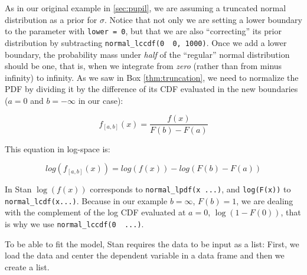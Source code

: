 \documentclass[12pt,]{krantz}
\newenvironment{Shaded}{\begin{snugshade}}{\end{snugshade}}
\newcommand{\KeywordTok}[1]{\textcolor[rgb]{0.13,0.29,0.53}{\textbf{#1}}}
\newcommand{\DataTypeTok}[1]{\textcolor[rgb]{0.13,0.29,0.53}{#1}}
\newcommand{\StringTok}[1]{\textcolor[rgb]{0.31,0.60,0.02}{#1}}
\newcommand{\OperatorTok}[1]{\textcolor[rgb]{0.81,0.36,0.00}{\textbf{#1}}}
\newcommand{\NormalTok}[1]{#1}
\theoremstyle{definition}
\theoremstyle{definition}
\theoremstyle{definition}
\theoremstyle{remark}
\begin{document}
As in our original example in \ref{sec:pupil}, we are assuming a
truncated normal distribution as a prior for \(\sigma\). Notice that not
only we are setting a lower boundary to the parameter with
\texttt{lower\ =\ 0}, but that we are also ``correcting'' its prior
distribution by subtracting
\texttt{normal\_lccdf(0\ \textbar{}\ 0,\ 1000)}. Once we add a lower
boundary, the probability mass under \emph{half} of the ``regular''
normal distribution should be one, that is, when we integrate from
\emph{zero} (rather than from minus infinity) to infinity. As we saw in
Box \ref{thm:truncation}, we need to normalize the PDF by dividing it by
the difference of its CDF evaluated in the new boundaries (\(a = 0\) and
\(b = - \infty\) in our case):

\begin{equation}
f_{[a,b]}(x) = \frac{f(x)}{F(b) - F(a)}
\label{eq:truncPDF}
\end{equation}

This equation in log-space is:

\begin{equation}
log(f_{[a,b]}(x)) = log(f(x)) - log(F(b) - F(a))
\label{eq:truncPDF}
\end{equation}

In Stan \(\log(f(x))\) corresponds to
\texttt{normal\_lpdf(x\ \textbar{}...)}, and \texttt{log(F(x))} to
\texttt{normal\_lcdf(x\textbar{}...)}. Because in our example
\(b=\infty\), \(F(b) = 1\), we are dealing with the complement of the
log CDF evaluated at \(a =0\), \(\log(1 - F(0))\), that is why we use
\texttt{normal\_lccdf(0\ \textbar{}\ ...)}.

To be able to fit the model, Stan requires the data to be input as a
list: First, we load the data and center the dependent variable in a
data frame and then we create a list.

\begin{Shaded}
\end{Shaded}

\begin{Shaded}
\end{Shaded}
\end{document}
